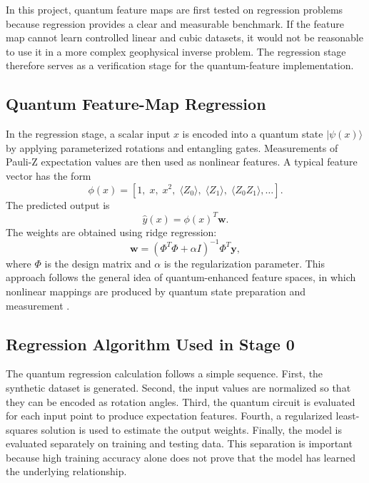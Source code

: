 \documentclass[12pt,a4paper]{article}
\begin{document}
In this project, quantum feature maps are first tested on regression problems because regression provides a clear and measurable benchmark. If the feature map cannot learn controlled linear and cubic datasets, it would not be reasonable to use it in a more complex geophysical inverse problem. The regression stage therefore serves as a verification stage for the quantum-feature implementation.

\subsection{Quantum Feature-Map Regression}
In the regression stage, a scalar input $x$ is encoded into a quantum state $|\psi(x)\rangle$ by applying parameterized rotations and entangling gates. Measurements of Pauli-Z expectation values are then used as nonlinear features. A typical feature vector has the form
\begin{equation}
    \phi(x) =
    \left[
    1,\; x,\; x^2,\;
    \langle Z_0 \rangle,\;
    \langle Z_1 \rangle,\;
    \langle Z_0 Z_1 \rangle,\ldots
    \right].
\end{equation}
The predicted output is
\begin{equation}
    \hat{y}(x)=\phi(x)^T\mathbf{w}.
\end{equation}
The weights are obtained using ridge regression:
\begin{equation}
    \mathbf{w}
    =
    (\Phi^T\Phi+\alpha I)^{-1}\Phi^T\mathbf{y},
\end{equation}
where $\Phi$ is the design matrix and $\alpha$ is the regularization parameter. This approach follows the general idea of quantum-enhanced feature spaces, in which nonlinear mappings are produced by quantum state preparation and measurement \cite{schuld2019,havlicek2019}.

\subsection{Regression Algorithm Used in Stage 0}
The quantum regression calculation follows a simple sequence. First, the synthetic dataset is generated. Second, the input values are normalized so that they can be encoded as rotation angles. Third, the quantum circuit is evaluated for each input point to produce expectation features. Fourth, a regularized least-squares solution is used to estimate the output weights. Finally, the model is evaluated separately on training and testing data. This separation is important because high training accuracy alone does not prove that the model has learned the underlying relationship.
\end{document}
